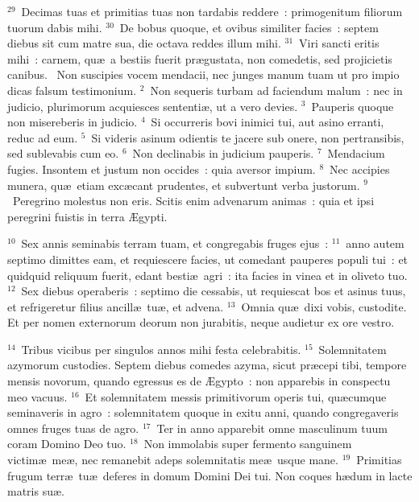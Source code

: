 ${}^{29}$~Decimas tuas et primitias tuas non tardabis reddere~: primogenitum filiorum tuorum dabis mihi.
${}^{30}$~De bobus quoque, et ovibus similiter facies~: septem diebus sit cum matre sua, die octava reddes illum mihi.
${}^{31}$~Viri sancti eritis mihi~: carnem, qu\ae\ a bestiis fuerit pr\ae gustata, non comedetis, sed projicietis canibus.
~\lettrine[lines=10,image=true,loversize=0.05,lraise=-0.03]{N}{}on suscipies vocem mendacii, nec junges manum tuam ut pro impio dicas falsum testimonium.
${}^{2}$~Non sequeris turbam ad faciendum malum~: nec in judicio, plurimorum acquiesces sententi\ae , ut a vero devies.
${}^{3}$~Pauperis quoque non misereberis in judicio.
${}^{4}$~Si occurreris bovi inimici tui, aut asino erranti, reduc ad eum.
${}^{5}$~Si videris asinum odientis te jacere sub onere, non pertransibis, sed sublevabis cum eo.
${}^{6}$~Non declinabis in judicium pauperis.
${}^{7}$~Mendacium fugies. Insontem et justum non occides~: quia aversor impium.
${}^{8}$~Nec accipies munera, qu\ae\ etiam exc\ae cant prudentes, et subvertunt verba justorum.
${}^{9}$~Peregrino molestus non eris. Scitis enim advenarum animas~: quia et ipsi peregrini fuistis in terra \AE gypti.


${}^{10}$~Sex annis seminabis terram tuam, et congregabis fruges ejus~:
${}^{11}$~anno autem septimo dimittes eam, et requiescere facies, ut comedant pauperes populi tui~: et quidquid reliquum fuerit, edant besti\ae\ agri~: ita facies in vinea et in oliveto tuo.
${}^{12}$~Sex diebus operaberis~: septimo die cessabis, ut requiescat bos et asinus tuus, et refrigeretur filius ancill\ae\ tu\ae , et advena.
${}^{13}$~Omnia qu\ae\ dixi vobis, custodite. Et per nomen externorum deorum non jurabitis, neque audietur ex ore vestro.


${}^{14}$~Tribus vicibus per singulos annos mihi festa celebrabitis.
${}^{15}$~Solemnitatem azymorum custodies. Septem diebus comedes azyma, sicut pr\ae cepi tibi, tempore mensis novorum, quando egressus es de \AE gypto~: non apparebis in conspectu meo vacuus.
${}^{16}$~Et solemnitatem messis primitivorum operis tui, qu\ae cumque seminaveris in agro~: solemnitatem quoque in exitu anni, quando congregaveris omnes fruges tuas de agro.
${}^{17}$~Ter in anno apparebit omne masculinum tuum coram Domino Deo tuo.
${}^{18}$~Non immolabis super fermento sanguinem victim\ae\ me\ae , nec remanebit adeps solemnitatis me\ae\ usque mane.
${}^{19}$~Primitias frugum terr\ae\ tu\ae\ deferes in domum Domini Dei tui. Non coques h\ae dum in lacte matris su\ae .


